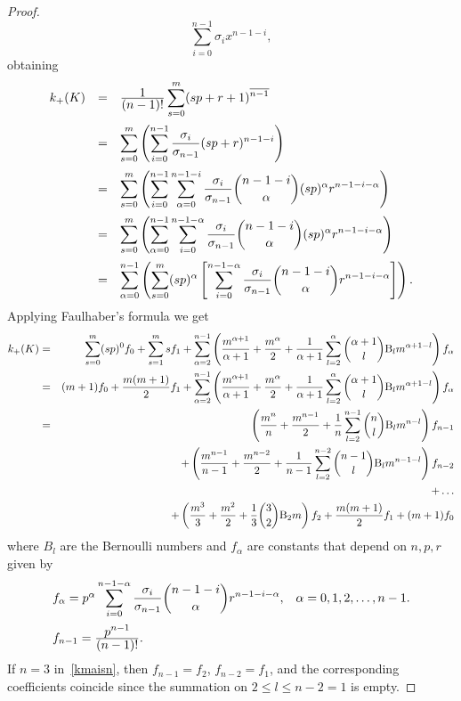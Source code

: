 \documentclass[11pt,a4paper,times]{amsart}
\theoremstyle{plain}
\theoremstyle{definition}
\numberwithin{equation}{section}
\newcommand{\ds}{\displaystyle}
\newcommand{\dsum}{\ds\sum}
\newcommand{\eqskip}{ \vspace*{2mm}\\ }
\newcommand{\B}{{\rm B}} %
\newcommand{\fr}[2]{\frac{\ds #1}{\ds #2}}
\begin{document}
{\begin{proof}
\[\dsum_{i=0}^{n-1}\sigma_ix^{n-1-i},
\]
obtaining 
\[
\begin{array}{lll}
k_+(K) & = &  \fr{1}{(n-1)!}\dsum_{s=0}^m(sp+r+1)^{\overline{n-1}}\eqskip
& = & \dsum_{s=0}^{m}\left(  \dsum_{i=0}^{n-1}\fr{\sigma_i}{\sigma_{n-1}}(sp +r)^{n-1-i}\right) \eqskip
& = & \dsum_{s=0}^{m}\left(  \dsum_{i=0}^{n-1}\dsum_{\alpha=0}^{n-1-i}\fr{\sigma_i}{\sigma_{n-1}}\binom{n-1-i}{\alpha}(sp)^{\alpha} r^{n-1-i-\alpha}\right)\eqskip
& = & \dsum_{s=0}^{m}\left(  \dsum_{\alpha=0}^{n-1}\dsum_{i=0}^{n-1-\alpha}\frac{\sigma_i}{\sigma_{n-1}}\binom{n-1-i}{\alpha}(sp)^{\alpha} r^{n-1-i-\alpha}\right)\eqskip
& = & \dsum_{\alpha=0}^{n-1}\left(\dsum_{s=0}^{m}(sp)^{\alpha}\left[\sum_{i=0}^{n-1-\alpha}
 \frac{\sigma_i}{\sigma_{n-1}}\binom{n-1-i}{\alpha} r^{n-1-i-\alpha}\right]\right).
\end{array}
\]
Applying Faulhaber's formula we get
 \begin{eqnarray}
k_+(K) &=&  \sum_{s=0}^m(sp)^0f_0
 +\sum_{s=1}^m s f_1+
\sum_{\alpha=2}^{n-1}\left(\frac{m^{\alpha+1}}{\alpha+1}+\frac{m^{\alpha}}{2}+\frac{1}{\alpha+1}\sum_{l=2}^{\alpha}\binom{\alpha+1}{l}\B_lm^{\alpha+1-l}\right)f_{\alpha}\nonumber\eqskip
&=& (m+1)f_0+\frac{m(m+1)}{2}f_1+ \sum_{\alpha=2}^{n-1}\left(\frac{m^{\alpha+1}}{\alpha+1}+\frac{m^{\alpha}}{2}+\frac{1}{\alpha+1}
\sum_{l=2}^{\alpha}\binom{\alpha+1}{l}\B_lm^{\alpha+1-l}\right)f_{\alpha}\nonumber\eqskip
&=&
\left(\fr{m^n}{n}+\frac{m^{n-1}}{2}+\frac{1}{n}\sum_{l=2}^{n-1}\binom{n}{l}\B_lm^{n-l}\right)f_{n-1}\nonumber\eqskip
&&\hspace*{5mm}+\left(\frac{m^{n-1}}{n-1}+\frac{m^{n-2}}{2}+\frac{1}{n-1}\sum_{l=2}^{n-2}\binom{n-1}{l}\B_lm^{n-1-l}\right)f_{n-2}\nonumber\eqskip
&&\hspace*{10mm}+\ldots    \label{kmaisn}\eqskip
&&\hspace*{15mm}+\left(\frac{m^3}{3}+\frac{m^2}{2}+\frac{1}{3} \binom{3}{2}\B_2m\right)f_2+ \frac{m(m+1)}{2}f_1+(m+1)f_0\nonumber
\end{eqnarray}  
where $B_l$ are the Bernoulli numbers and    $f_{\alpha}$ are constants that  depend on $n,p,r$  given by
\[\begin{array}{ll}
f_{\alpha}=p^{\alpha}\dsum_{i=0}^{n-1-\alpha}
 \fr{\sigma_i}{\sigma_{n-1}}\binom{n-1-i}{\alpha} r^{n-1-i-\alpha}, & \alpha=0,1,2,  \ldots, n-1.\eqskip
 f_{n-1}=\fr{p^{n-1}}{(n-1)!}.
 \end{array}\]
 If $n=3$ in~\eqref{kmaisn}, then  $f_{n-1}=f_2$, $f_{n-2}=f_1$, and the corresponding coefficients coincide since the summation on $2\leq l\leq n-2=1$ is empty.

\end{proof}}
\end{document}
